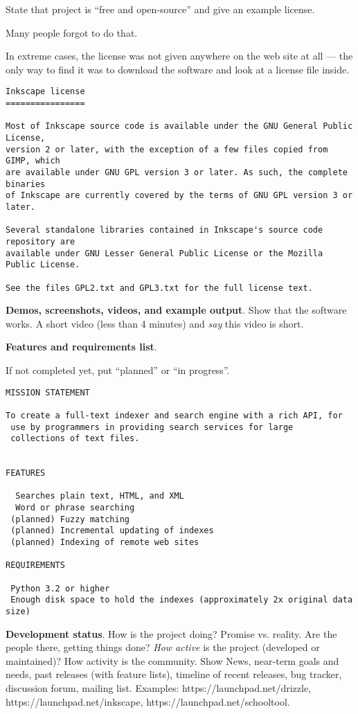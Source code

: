 \documentclass[landscape,30pt]{foils}
\begin{document}
State that project is ``free and open-source'' and give an example
license.

Many people forgot to do that.

In extreme cases, the license was not given anywhere on the web site
at all — the only way to find it was to download the software and look
at a license file inside.


{\tiny
\begin{verbatim}
Inkscape license
================

Most of Inkscape source code is available under the GNU General Public License,
version 2 or later, with the exception of a few files copied from GIMP, which
are available under GNU GPL version 3 or later. As such, the complete binaries
of Inkscape are currently covered by the terms of GNU GPL version 3 or later.

Several standalone libraries contained in Inkscape's source code repository are
available under GNU Lesser General Public License or the Mozilla Public License.

See the files GPL2.txt and GPL3.txt for the full license text.
\end{verbatim}
}

{\bf Demos, screenshots, videos, and example output}.  Show that the software works.  A short video (less than 4 minutes) and {\em say} this video is short.

{\bf Features and requirements list}.

If not completed yet, put ``planned'' or ``in progress''.
{\tiny
\begin{verbatim}
MISSION STATEMENT

To create a full-text indexer and search engine with a rich API, for
 use by programmers in providing search services for large
 collections of text files.


FEATURES

  Searches plain text, HTML, and XML
  Word or phrase searching
 (planned) Fuzzy matching
 (planned) Incremental updating of indexes
 (planned) Indexing of remote web sites

REQUIREMENTS

 Python 3.2 or higher
 Enough disk space to hold the indexes (approximately 2x original data size)

\end{verbatim}
}

{\bf Development status}.  How is the project doing?  Promise vs. reality.  Are the people there, getting things done? {\em How active} is the project (developed or maintained)?  How activity is the community.  Show News, near-term goals and needs, past releases (with feature lists), timeline of recent releases, bug tracker, discussion forum, mailing list. Examples: https://launchpad.net/drizzle, https://launchpad.net/inkscape, https://launchpad.net/schooltool.
\end{document}
